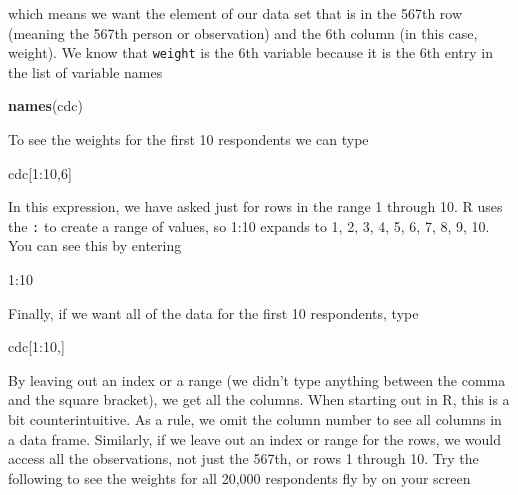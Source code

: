 \documentclass[]{book}
\newenvironment{Shaded}{\begin{snugshade}}{\end{snugshade}}
\newcommand{\KeywordTok}[1]{\textcolor[rgb]{0.13,0.29,0.53}{\textbf{{#1}}}}
\newcommand{\DecValTok}[1]{\textcolor[rgb]{0.00,0.00,0.81}{{#1}}}
\newcommand{\NormalTok}[1]{{#1}}
\theoremstyle{definition}
\theoremstyle{definition}
\theoremstyle{definition}
\theoremstyle{remark}
\begin{document}
which means we want the element of our data set that is in the 567th row
(meaning the 567th person or observation) and the 6th column (in this
case, weight). We know that \texttt{weight} is the 6th variable because
it is the 6th entry in the list of variable names

\begin{Shaded}
\begin{Highlighting}[]
\KeywordTok{names}\NormalTok{(cdc)}
\end{Highlighting}
\end{Shaded}

To see the weights for the first 10 respondents we can type

\begin{Shaded}
\begin{Highlighting}[]
\NormalTok{cdc[}\DecValTok{1}\NormalTok{:}\DecValTok{10}\NormalTok{,}\DecValTok{6}\NormalTok{]}
\end{Highlighting}
\end{Shaded}

In this expression, we have asked just for rows in the range 1 through
10. R uses the \texttt{:} to create a range of values, so 1:10 expands
to 1, 2, 3, 4, 5, 6, 7, 8, 9, 10. You can see this by entering

\begin{Shaded}
\begin{Highlighting}[]
\DecValTok{1}\NormalTok{:}\DecValTok{10}
\end{Highlighting}
\end{Shaded}

Finally, if we want all of the data for the first 10 respondents, type

\begin{Shaded}
\begin{Highlighting}[]
\NormalTok{cdc[}\DecValTok{1}\NormalTok{:}\DecValTok{10}\NormalTok{,]}
\end{Highlighting}
\end{Shaded}

By leaving out an index or a range (we didn't type anything between the
comma and the square bracket), we get all the columns. When starting out
in R, this is a bit counterintuitive. As a rule, we omit the column
number to see all columns in a data frame. Similarly, if we leave out an
index or range for the rows, we would access all the observations, not
just the 567th, or rows 1 through 10. Try the following to see the
weights for all 20,000 respondents fly by on your screen
\end{document}
